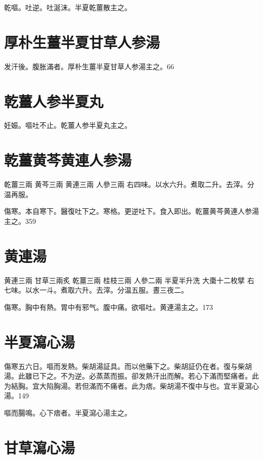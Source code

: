 \documentclass[b5paper,twoside,zihao=-4,UTF8]{ctexbook}
\begin{document}
乾嘔。吐逆。吐涎沫。半夏乾薑散主之。

\section{厚朴生薑半夏甘草人参湯}

发汗後。腹胀滿者。厚朴{生薑半夏甘草人参}湯主之。66

\section{乾薑人参半夏丸}

妊娠。嘔吐不止。乾薑人参半夏丸主之。

\section{乾薑黄芩黄連人参湯}

乾薑{\scriptsize 三兩} 黄芩{\scriptsize 三兩} 黄連{\scriptsize 三兩} 人參{\scriptsize 三兩}
右四味。以水六升。煮取二升。去滓。分温再服。

傷寒。本自寒下。醫復吐{下}之。寒格。更逆吐{下}。食入即出。乾薑黄芩黄連人参湯主之。359

\section{黄連湯}

黄連{\scriptsize 三兩} 甘草{\scriptsize 三兩炙} 乾薑{\scriptsize 三兩} 桂枝{\scriptsize 三兩} 人參{\scriptsize 二兩} 半夏{\scriptsize 半升洗} 大棗{\scriptsize 十二枚擘}
右七味。以水一斗。煮取六升。去滓。分温五服。晝三夜二。

傷寒。胸中有熱。胃中有邪气。腹中痛。欲嘔吐。黄連湯主之。173

\section{半夏瀉心湯}

傷寒五六日。嘔而发熱。柴胡湯証具。而以他藥下之。柴胡証仍在者。復与柴胡湯。此雖已下之。不为逆。必蒸蒸而振。卻发熱汗出而解。若心下滿而堅痛者。此为結胸。宜大陷胸湯。若但滿而不痛者。此为痞。柴胡{湯}不復中与也。宜半夏瀉心湯。149

嘔而腸鳴。心下痞者。半夏瀉心湯主之。

\section{甘草瀉心湯}
\end{document}
